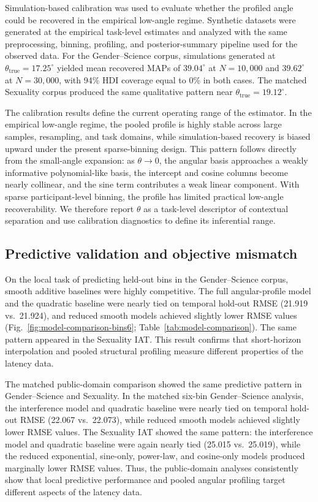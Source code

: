 \documentclass[12pt]{article}
\begin{document}
Simulation-based calibration was used to evaluate whether the profiled angle could be recovered in the empirical low-angle regime. Synthetic datasets were generated at the empirical task-level estimates and analyzed with the same preprocessing, binning, profiling, and posterior-summary pipeline used for the observed data. For the Gender--Science corpus, simulations generated at $\theta_{\mathrm{true}}=17.25^\circ$ yielded mean recovered MAPs of $39.04^\circ$ at $N=10{,}000$ and $39.62^\circ$ at $N=30{,}000$, with 94\% HDI coverage equal to 0\% in both cases. The matched Sexuality corpus produced the same qualitative pattern near $\theta_{\mathrm{true}}=19.12^\circ$.

The calibration results define the current operating range of the estimator. In the empirical low-angle regime, the pooled profile is highly stable across large samples, resampling, and task domains, while simulation-based recovery is biased upward under the present sparse-binning design. This pattern follows directly from the small-angle expansion: as $\theta \to 0$, the angular basis approaches a weakly informative polynomial-like basis, the intercept and cosine columns become nearly collinear, and the sine term contributes a weak linear component. With sparse participant-level binning, the profile has limited practical low-angle recoverability. We therefore report \(\theta\) as a task-level descriptor of contextual separation and use calibration diagnostics to define its inferential range.

\subsection{Predictive validation and objective mismatch}
On the local task of predicting held-out bins in the Gender--Science corpus, smooth additive baselines were highly competitive. The full angular-profile model and the quadratic baseline were nearly tied on temporal hold-out RMSE (21.919 vs.\ 21.924), and reduced smooth models achieved slightly lower RMSE values (Fig.~\ref{fig:model-comparison-bins6}; Table~\ref{tab:model-comparison}). The same pattern appeared in the Sexuality IAT. This result confirms that short-horizon interpolation and pooled structural profiling measure different properties of the latency data.

The matched public-domain comparison showed the same predictive pattern in Gender--Science and Sexuality. In the matched six-bin Gender--Science analysis, the interference model and quadratic baseline were nearly tied on temporal hold-out RMSE (22.067 vs.\ 22.073), while reduced smooth models achieved slightly lower RMSE values. The Sexuality IAT showed the same pattern: the interference model and quadratic baseline were again nearly tied (25.015 vs.\ 25.019), while the reduced exponential, sine-only, power-law, and cosine-only models produced marginally lower RMSE values. Thus, the public-domain analyses consistently show that local predictive performance and pooled angular profiling target different aspects of the latency data.
\end{document}
